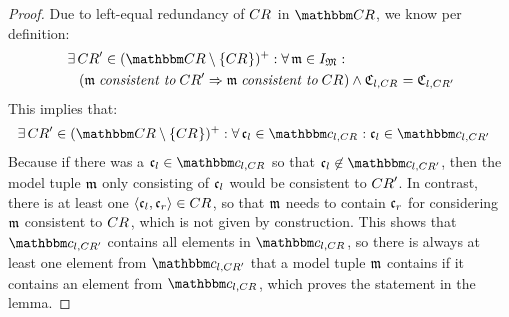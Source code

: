 \begin{proof}
    Due to left-equal redundancy of $\consistencyrelation{CR}{}$ in $\consistencyrelationset{CR}$, we know per definition:
    \begin{align*}
        &
        \exists \consistencyrelation{CR}{}' \in \transitiveclosure{(\consistencyrelationset{CR} \setminus \setted{\consistencyrelation{CR}{}})} :
        \forall \modeltuple{m} \in \metamodeltupleinstanceset{M} : \\
        & \formulaskip
        (\modeltuple{m} \consistenttomath \consistencyrelation{CR}{}' \Rightarrow \modeltuple{m} \consistenttomath \consistencyrelation{CR}{}) %
        \land 
        \classtuple{C}{l,\consistencyrelation{CR}{}} = \classtuple{C}{l,\consistencyrelation{CR}{}'}
    \end{align*}
    This implies that:
    \begin{align*}
        &
        \exists \consistencyrelation{CR}{}' \in \transitiveclosure{(\consistencyrelationset{CR} \setminus \setted{\consistencyrelation{CR}{}})} :
        \forall \conditionelement{c}{l} \in \condition{c}{l,\consistencyrelation{CR}{}} :
        \conditionelement{c}{l} \in \condition{c}{l,\consistencyrelation{CR}{}'}
    \end{align*}
    Because if there was a $\conditionelement{c}{l} \in \condition{c}{l,\consistencyrelation{CR}{}}$ so that $\conditionelement{c}{l} \not\in \condition{c}{l,\consistencyrelation{CR}{}'}$, then the model tuple $\modeltuple{m}$ only consisting of $\conditionelement{c}{l}$ would be consistent to $\consistencyrelation{CR}{}'$. %
    In contrast, there is at least one $\tupled{\conditionelement{c}{l}, \conditionelement{c}{r}} \in \consistencyrelation{CR}{}$, so that $\modeltuple{m}$ needs to contain $\conditionelement{c}{r}$ for considering $\modeltuple{m}$ consistent to $\consistencyrelation{CR}{}$, which is not given by construction.
    This shows that $\condition{c}{l,\consistencyrelation{CR}{}'}$ contains all elements in $\condition{c}{l,\consistencyrelation{CR}{}}$, so there is always at least one element from $\condition{c}{l,\consistencyrelation{CR}{}'}$ that a model tuple $\modeltuple{m}$ contains if it contains an element from $\condition{c}{l,\consistencyrelation{CR}{}}$, %
    which proves the statement in the lemma.
\end{proof}

